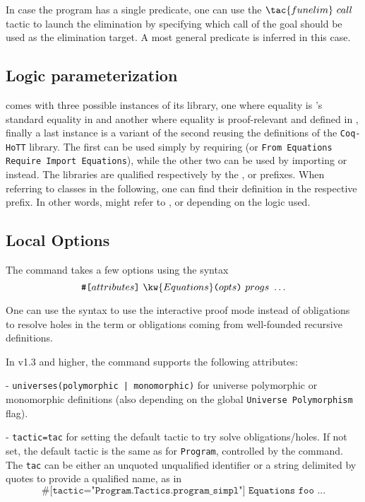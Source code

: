 In case the program has a single predicate, one can use the
$\tac{funelim}~call$ tactic to launch the elimination by specifying
which call of the goal should be used as the elimination target.
A most general predicate is inferred in this case.

\subsection{Logic parameterization}

\Equations comes with three possible instances of its library,
one where equality is \Coq's standard equality  in \Prop and
another where equality is proof-relevant and defined in , finally 
a last instance is a variant of the second reusing the definitions of the 
\texttt{Coq-HoTT} library.
The first can be used simply by requiring 
(or \texttt{From Equations Require Import Equations}),
while the other two can be used by importing 
or  instead. The libraries are qualified respectively 
by the , or  prefixes. 
When referring to classes in the following, one can find their definition in the respective prefix. 
In other words,  might refer to ,
 or 
depending on the logic used.

\subsection{Local Options}
The  command takes a few options using the syntax
\[\texttt{\#[}attributes\texttt{]}~\kw{Equations}\texttt{(}opts\texttt{)} ~progs~\ldots\]

One can use the  syntax to use the interactive proof mode
instead of obligations to resolve holes in the term or obligations
coming from well-founded recursive definitions.

In \Equations v1.3 and higher, the command supports the following attributes:
  
- \texttt{universes(polymorphic | monomorphic)} for universe polymorphic or
  monomorphic definitions (also depending on the global \texttt{Universe Polymorphism} flag).

- \texttt{tactic=tac} for setting the default tactic to try solve obligations/holes.
  If not set, the default tactic is the same as for \texttt{Program}, controlled by
  the  command. The \texttt{tac} can be either an unquoted 
  unqualified identifier or a string delimited by quotes to provide a qualified name, as in 
  \[\texttt{\#[tactic="Program.Tactics.program\_simpl"] Equations foo ...}\]

